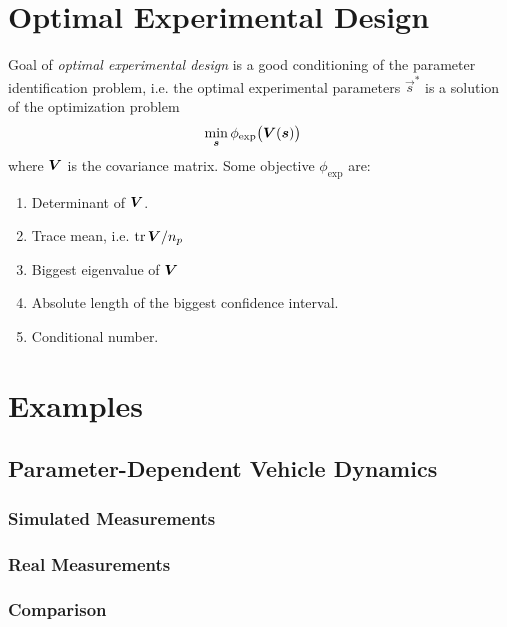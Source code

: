 	\section{Optimal Experimental Design}
		Goal of \emph{optimal experimental design} is a good conditioning of the parameter identification problem, i.e. the optimal experimental parameters \( \vec{s}^\ast \) is a solution of the optimization problem
		\begin{align*}
			\min_{\bm{s}} &\, \phi_\mathrm{exp}\big(\bm{V}(\bm{s})\big)
		\end{align*}
		where \(\bm{V}\) is the covariance matrix. Some objective \(\phi_\mathrm{exp}\) are:
		\begin{enumerate}
			\item Determinant of \(\bm{V}\).
			\item Trace mean, i.e. \( \tr \bm{V} / n_p \)
			\item Biggest eigenvalue of \(\bm{V}\)
			\item Absolute length of the biggest confidence interval.
			\item Conditional number.
		\end{enumerate}

	\section{Examples} %

		\subsection{Parameter-Dependent Vehicle Dynamics} %

			\subsubsection{Simulated Measurements} %

			\subsubsection{Real Measurements} %

			\subsubsection{Comparison} %

